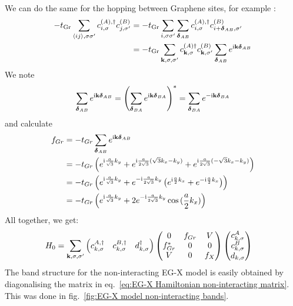 \documentclass[../main.tex]{subfiles}
\begin{document}
We can do the same for the hopping between Graphene sites, for example :
\begin{align}
    -t_{\mathrm{Gr}} \sum_{\langle ij \rangle, \sigma \sigma^{\prime}} c_{i, \sigma}^{(A), \dagger} c_{j, \sigma^{\prime}}^{(B)}
    &= -t_{\mathrm{Gr}} \sum_{i, \sigma \sigma^{\prime}} \sum_{\bm{\mathrm{\delta}}_{AB}} c_{i, \sigma}^{(A), \dagger} c_{i + \bm{\mathrm{\delta}}_{AB} , \sigma^{\prime}}^{(B)} \\
    &= -t_{\mathrm{Gr}} \sum_{\bm{\mathrm{k}}, \sigma, \sigma^{\prime}}  c_{\bm{\mathrm{k}}, \sigma}^{(A) \dagger} c_{\bm{\mathrm{k}}, \sigma^{\prime}}^{(B)} \sum_{\bm{\mathrm{\delta}}_{AB}} e^{\mathrm{i} \bm{\mathrm{k}} \bm{\mathrm{\delta}}_{AB}}
\end{align}
We note
\begin{align}
    \sum_{\bm{\mathrm{\delta}}_{AB}} e^{\mathrm{i} \bm{\mathrm{k}} \bm{\mathrm{\delta}}_{AB}} = \left( \sum_{\bm{\mathrm{\delta}}_{BA}} e^{\mathrm{i} \bm{\mathrm{k}} \bm{\mathrm{\delta}}_{BA}} \right)^* = \sum_{\bm{\mathrm{\delta}}_{BA}} e^{-\mathrm{i} \bm{\mathrm{k}} \bm{\mathrm{\delta}}_{BA}}
\end{align}
and calculate
\begin{align}
    f_{Gr} &= -t_{Gr} \sum_{\bm{\mathrm{\delta}}_{AB}} e^{\mathrm{i} \bm{\mathrm{k}} \bm{\mathrm{\delta}}_{AB}} \\
    &= -t_{Gr} \left(
    e^{\mathrm{i} \frac{a}{\sqrt{3}} k_y} +
    e^{\mathrm{i} \frac{a}{2\sqrt{3}} (\sqrt{3} k_x - k_y)} +
    e^{\mathrm{i} \frac{a}{2\sqrt{3}} (-\sqrt{3} k_x - k_y)} \right) \\
    &= -t_{Gr} \left(
    e^{\mathrm{i} \frac{a}{\sqrt{3}} k_y} +
    e^{-\mathrm{i} \frac{a}{2\sqrt{3}} k_y} \left(
        e^{\mathrm{i} \frac{a}{2} k_x} + e^{-\mathrm{i} \frac{a}{2} k_x}
    \right) \right) \\
    &= -t_{Gr} \left(
    e^{\mathrm{i} \frac{a}{\sqrt{3}} k_y} +
    2 e^{-\mathrm{i} \frac{a}{2\sqrt{3}} k_y}
    \cos{(\frac{a}{2} k_x)} \right)
\end{align}
All together, we get:
\begin{align}
    H_0 &= \sum_{\bm{\mathrm{k}}, \sigma, \sigma^{\prime}} \begin{pmatrix} c_{k, \sigma}^{A, \dagger} & c_{k, \sigma}^{B, \dagger} & d_{k, \sigma}^{\dagger} \end{pmatrix}
    \begin{pmatrix}
        0 & f_{Gr} & V \\
        f_{Gr}^* & 0 & 0 \\
        V & 0 & f_{X}
    \end{pmatrix} \begin{pmatrix} c_{k, \sigma}^{A} \\ c_{k, \sigma}^{B} \\ d_{k, \sigma} \end{pmatrix}
    \label{eq:EG-X Hamiltonian non-interacting matrix}
\end{align}
The band structure for the non-interacting EG-X model is easily obtained by diagonalising the matrix in eq.~\ref{eq:EG-X Hamiltonian non-interacting matrix}.
This was done in fig.~\ref{fig:EG-X model non-interacting bands}.
\end{document}
